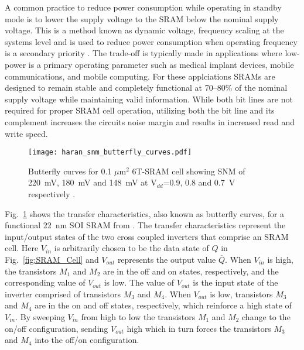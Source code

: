 A common practice to reduce power consumption while operating in standby mode is to lower the supply voltage to the SRAM below the nominal supply voltage.
This is a method known as dynamic voltage, frequency scaling at the systems level and is used to reduce power consumption when operating frequency is a secondary priority \cite{semeraro:2002dvfs,david:2011dvfs}.
The trade-off is typically made in applications where low-power is a primary operating parameter such as medical implant devices, mobile communications, and mobile computing.
For these applciations SRAMs are designed to remain stable and completely functional at 70--80\% of the nominal supply voltage while maintaining valid information.
While both bit lines are not required for proper SRAM cell operation, utilizing both the bit line and its complement increases the circuits noise margin and results in increased read and write speed.

\begin{figure}[tb]
    \begin{center}
        \texttt{[image: haran\_snm\_butterfly\_curves.pdf]}
    \end{center}
    \caption[Butterfly curves for 0.1 $\mu$m$^2$ 6T-SRAM cell showing SNM of 220~mV, 180~mV and 148~mV at V$_{dd}$=0.9, 0.8 and 0.7~V respectively.]{Butterfly curves for 0.1 $\mu$m$^2$ 6T-SRAM cell showing SNM of 220~mV, 180~mV and 148~mV at V$_{dd}$=0.9, 0.8 and 0.7~V respectively \cite{Haran:2008ta}.}
    \label{fig:22nm_soi_sram_butterfly_curve_snm}
\end{figure}

Fig.~\ref{fig:22nm_soi_sram_butterfly_curve_snm} shows the transfer characteristics, also known as butterfly curves, for a functional 22~nm SOI SRAM from \cite{Haran:2008ta}.
The transfer characteristics represent the input/output states of the two cross coupled inverters that comprise an SRAM cell.
Here $V_{in}$ is arbitrarily chosen to be the data state of $Q$ in Fig.~\ref{fig:SRAM_Cell} and $V_{out}$ represents the output value $\overline{Q}$. 
When $V_{in}$ is high, the transistors $M_1$ and $M_2$ are in the off and on states, respectively, and the corresponding value of $V_{out}$ is low.
The value of $V_{out}$ is the input state of the inverter comprised of transistors $M_3$ and $M_4$. 
When $V_{out}$ is low, transistors $M_3$ and $M_4$ are in the on and off states, respectively, which reinforce a high state of $V_{in}$.
By sweeping $V_{in}$ from high to low the transistors $M_1$ and $M_2$ change to the on/off configuration, sending $V_{out}$ high which in turn forces the transistors $M_3$ and $M_4$ into the off/on configuration.


